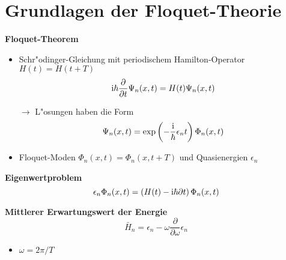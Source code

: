 \section{Grundlagen der Floquet-Theorie}
\begin{frame}
  \textbf{Floquet-Theorem} %
  \begin{itemize}
    \item Schr"odinger-Gleichung mit periodischem Hamilton-Operator $H(t)=H(t+T)$
    \begin{equation}
      \text i\hbar \frac{\partial}{\partial t} \Psi_n(x,t) = H(t)\Psi_n(x,t)
    \end{equation}

    $\rightarrow$ L"osungen haben die Form
    \begin{equation}
      \Psi_n(x,t)=\exp\left(-\frac{\text i}{\hbar}\epsilon_nt\right)\Phi_n(x,t)
    \end{equation}

    \item Floquet-Moden $\Phi_n(x,t)=\Phi_n(x,t+T)$ und Quasienergien $\epsilon_n$
  \end{itemize}

  \textbf{Eigenwertproblem}
  \begin{equation} %
    \epsilon_n \Phi_n(x,t) = \left(H(t)-\text i\hbar \partial t\right) \Phi_n(x,t)
  \end{equation}

  \textbf{Mittlerer Erwartungswert der Energie } %
  \begin{equation}%
    \bar H_n = \epsilon_n-\omega \frac{\partial}{\partial \omega} \epsilon_n
  \end{equation}
  \begin{itemize}
   \item $\omega=2\pi/T$
 \end{itemize}
\end{frame}






